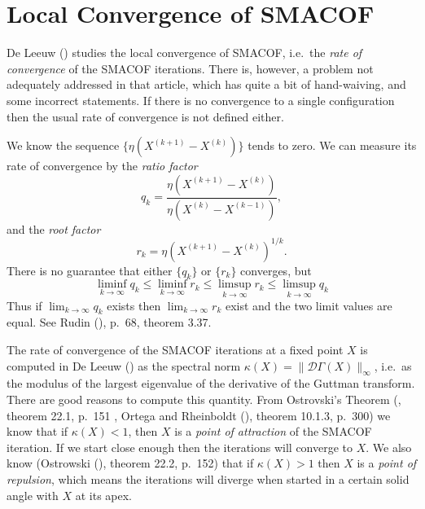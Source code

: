 \documentclass[
  12pt,
  letterpaper,
  DIV=11,
  numbers=noendperiod]{scrartcl}
\newcommand{\sectionbreak}{\clearpage}
\begin{document}
\sectionbreak

\section{Local Convergence of SMACOF}\label{local-convergence-of-smacof}

De Leeuw () studies the local
convergence of SMACOF, i.e.~the \emph{rate of convergence} of the SMACOF
iterations. There is, however, a problem not adequately addressed in
that article, which has quite a bit of hand-waiving, and some incorrect
statements. If there is no convergence to a single configuration then
the usual rate of convergence is not defined either.

We know the sequence \(\{\eta(X^{(k+1)}-X^{(k)})\}\) tends to zero. We
can measure its rate of convergence by the \emph{ratio factor}
\begin{equation}
q_k=\frac{\eta(X^{(k+1)}-X^{(k)})}{\eta(X^{(k)}-X^{(k-1)})},
\end{equation} and the \emph{root factor} \begin{equation}
r_k=\eta(X^{(k+1)}-X^{(k)})^{1/k}.
\end{equation} There is no guarantee that either \(\{q_k\}\) or
\(\{r_k\}\) converges, but \begin{equation}
\liminf_{k\rightarrow\infty} q_k\leq\liminf_{k\rightarrow\infty} r_k\leq\limsup_{k\rightarrow\infty} r_k\leq\limsup_{k\rightarrow\infty} q_k
\end{equation} Thus if \(\lim_{k\rightarrow\infty} q_k\) exists then
\(\lim_{k\rightarrow\infty} r_k\) exist and the two limit values are
equal. See Rudin (), p.~68, theorem 3.37.

The rate of convergence of the SMACOF iterations at a fixed point \(X\)
is computed in De Leeuw () as the
spectral norm \(\kappa(X)=\|\mathcal{D}\Gamma(X)\|_\infty\), i.e.~as the
modulus of the largest eigenvalue of the derivative of the Guttman
transform. There are good reasons to compute this quantity. From
Ostrovski's Theorem (, theorem 22.1, p.~151 , Ortega and Rheinboldt
(), theorem 10.1.3, p.~300) we
know that if \(\kappa(X)<1\), then \(X\) is a \emph{point of attraction}
of the SMACOF iteration. If we start close enough then the iterations
will converge to \(X\). We also know (Ostrowski
(), theorem 22.2, p.~152) that if
\(\kappa(X)>1\) then \(X\) is a \emph{point of repulsion}, which means
the iterations will diverge when started in a certain solid angle with
\(X\) at its apex.
\end{document}
